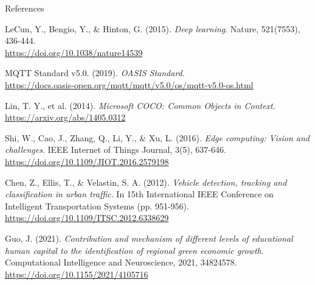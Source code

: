 \documentclass[final]{beamer}
\newlength{\colwidth}
\begin{document}
\begin{frame}[t]
\begin{columns}[t]
\begin{column}{\colwidth}
\begin{block}{References}
\begin{thebibliography}{9}
      LeCun, Y., Bengio, Y., \& Hinton, G. (2015). \textit{Deep learning}. Nature, 521(7553), 436-444. \\
      \url{https://doi.org/10.1038/nature14539}
      
      MQTT Standard v5.0. (2019). \textit{OASIS Standard}. \\
      \url{https://docs.oasis-open.org/mqtt/mqtt/v5.0/os/mqtt-v5.0-os.html}
      
      Lin, T. Y., et al. (2014). \textit{Microsoft COCO: Common Objects in Context}. \\
      \url{https://arxiv.org/abs/1405.0312}

      Shi, W., Cao, J., Zhang, Q., Li, Y., \& Xu, L. (2016). \textit{Edge computing: Vision and challenges}. IEEE Internet of Things Journal, 3(5), 637-646. \\
      \url{https://doi.org/10.1109/JIOT.2016.2579198}
      
      Chen, Z., Ellis, T., \& Velastin, S. A. (2012). \textit{Vehicle detection, tracking and classification in urban traffic}. In 15th International IEEE Conference on Intelligent Transportation Systems (pp. 951-956). \\
      \url{https://doi.org/10.1109/ITSC.2012.6338629}
      
      Guo, J. (2021). \textit{Contribution and mechanism of different levels of educational human capital to the identification of regional green economic growth}. Computational Intelligence and Neuroscience, 2021, 34824578. \\
      \url{https://doi.org/10.1155/2021/4105716}
    \end{thebibliography}
\end{block}

\end{column}

\end{columns}
\end{frame}
\end{document}
